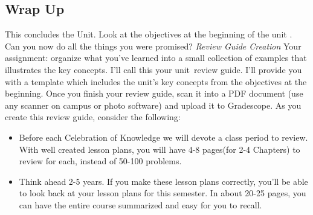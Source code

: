 \documentclass[10pt,]{book}
\theoremstyle{plain}
\theoremstyle{definition}
\theoremstyle{definition}
\theoremstyle{definition}
\theoremstyle{definition}
\theoremstyle{definition}
\renewcommand*{\chaptername}{Chapter}
\numberwithin{equation}{section}
\renewcommand{\chaptername}{Unit}
\begin{document}
\typeout{************************************************}
\typeout{************************************************}
\subsection[{Wrap Up}]{Wrap Up}\label{subsection-33}
This concludes the \chaptername .  Look at the objectives at the beginning of the unit . Can you now do all the things you were promised?   \emph{Review Guide Creation} Your assignment: organize what you've learned into a small collection of examples that illustrates the key concepts. I'll call this your unit~review guide. I'll provide you with a template which includes the unit's key concepts from the objectives at the beginning. Once you finish your review guide, scan it into a PDF document (use any scanner on campus or photo software) and upload it to Gradescope.  As you create this review guide, consider the following: \leavevmode%
\begin{itemize}[label=\textbullet]
\item{}Before each Celebration of Knowledge  we will devote a class period to review. With well created lesson plans, you will have 4-8 pages(for 2-4 Chapters) to review for each, instead of 50-100 problems.%
\item{}Think ahead 2-5 years. If you make these lesson plans correctly, you'll be able to look back at your lesson plans for this semester. In about 20-25 pages, you can have the entire course summarized and easy for you to recall.%
\end{itemize}
%
\typeout{************************************************}
\typeout{************************************************}
\end{document}
